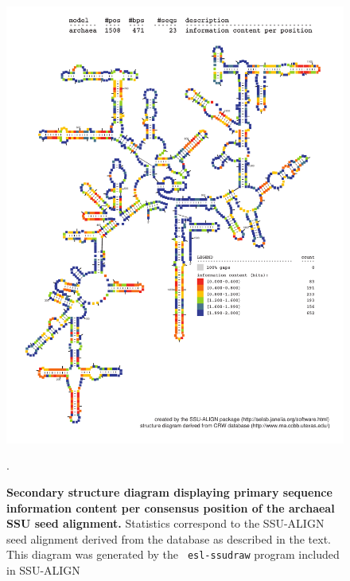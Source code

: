 \begin{figure}
\begin{center}
\includegraphics[width=5.7in]{Figures/archaea-0p1-info}
\end{center}
\caption[Secondary structure diagram displaying primary sequence
  information content per consensus position of the archaeal SSU seed
  alignment]{\textbf{Secondary structure diagram displaying primary
  sequence information content per consensus position of the archaeal SSU seed
  alignment.} Statistics correspond to the SSU-ALIGN seed
  alignment derived from the  database \cite{CannoneGutell02}
  as described in the text. This diagram was generated by the {\tt
  esl-ssudraw} program included in SSU-ALIGN}.
\label{fig:arcinfo}
\end{figure}

